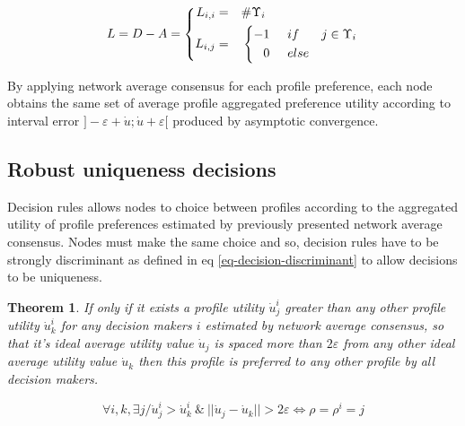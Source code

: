 \documentclass[conference]{IEEEtran}
\newtheorem{theorem}{Theorem}
\begin{document}
\begin{equation}
\label{eq-consensus-laplacian}
L = D - A = \left\{
      \begin{aligned}
      L_{i,i} &= &\#\Upsilon_i\hspace{2.6cm}\\
      L_{i,j} &= &\left\{
                \begin{aligned}
                -1 \hspace{0.5cm} &if& j \in \Upsilon_i \\
                 0 \hspace{0.5cm} &else& \\
                \end{aligned}
                \right.
      \end{aligned}
    \right.
\end{equation}

By applying network average consensus for each profile preference, each node obtains the same set of average profile aggregated preference utility according to interval error $]- \varepsilon + \dot{u} ; \dot{u} + \varepsilon [$ produced by asymptotic convergence.

\subsection{Robust uniqueness decisions}
Decision rules allows nodes to choice between profiles according to the aggregated utility of profile preferences estimated by previously presented network average consensus. Nodes must make the same choice and so, decision rules have to be strongly discriminant as defined in eq \ref{eq-decision-discriminant} to allow decisions to be uniqueness. 

\begin{theorem}
\label{th-preference}
If only if it exists a profile utility $\dot{u}_j^i$ greater than any other profile utility $\dot{u}_k^i$ for any decision makers $i$ estimated by network average consensus, so that it's ideal average utility value $\dot{u}_j$ is spaced more than $2 \varepsilon$ from any other ideal average utility value $\dot{u}_k $ then this profile is preferred to any other profile by all decision makers. 

\begin{equation}
\label{eq-decision-discriminant}
\forall i, k, \exists j / \dot{u}_j^i > \dot{u}_k^i \ \& \ || \dot{u}_j - \dot{u}_k|| > 2 \varepsilon \Longleftrightarrow \rho = \rho^i = j
\end{equation}

\end{theorem}
\end{document}
